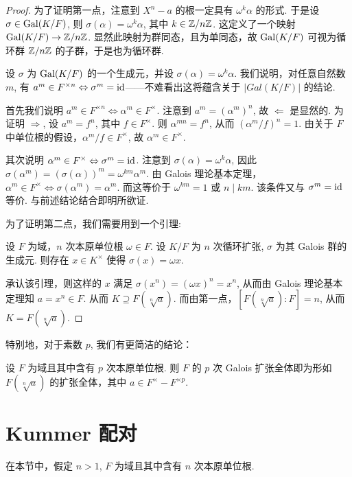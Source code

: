 \begin{proof}
  为了证明第一点，注意到 $X^n - a$ 的根一定具有 $\omega^k \alpha$ 的形式.  于是设 $\sigma \in \operatorname{Gal}(K/F)$, 则 $\sigma(\alpha) = \omega^k \alpha$, 其中 $k \in \mathbb Z/n\mathbb Z$.  这定义了一个映射 $\operatorname{Gal}(K/F) \to \mathbb Z/n\mathbb Z$.  显然此映射为群同态，且为单同态，故 $\operatorname{Gal}(K/F)$ 可视为循环群 $\mathbb Z/n\mathbb Z$ 的子群，于是也为循环群.

  设 $\sigma$ 为 $\operatorname{Gal}(K/F)$ 的一个生成元，并设 $\sigma(\alpha) = \omega^k \alpha$.  我们说明，对任意自然数 $m$, 有 $a^m \in F^{\times n} \Leftrightarrow \sigma^m = \operatorname{id}$——不难看出这将蕴含关于 $|Gal(K/F)|$ 的结论.

  首先我们说明 $a^m \in F^{\times n} \Leftrightarrow \alpha^m \in F^\times$.  注意到 $a^m = (\alpha^m)^n$, 故 $\Leftarrow$ 是显然的.  为证明 $\Rightarrow$, 设 $a^m = f^n$, 其中 $f \in F^\times$.  则 $\alpha^{mn} = f^n$, 从而 $(\alpha^m/f)^n = 1$.  由关于 $F$ 中单位根的假设，$\alpha^m/f \in F^\times$, 故 $\alpha^m \in F^\times$.

  其次说明 $\alpha^m \in F^\times \Leftrightarrow \sigma^m = \operatorname{id}$.  注意到 $\sigma(\alpha) = \omega^k \alpha$, 因此 $\sigma(\alpha^m) = (\sigma(\alpha))^m = \omega^{km} \alpha^m$.  由 Galois 理论基本定理，$\alpha^m \in F^\times \Leftrightarrow \sigma(\alpha^m) = \alpha^m$.  而这等价于 $\omega^{km} = 1$ 或 $n \mid km$.  该条件又与 $\sigma^m = \operatorname{id}$ 等价.  与前述结论结合即明所欲证.

  为了证明第二点，我们需要用到一个引理:
  \begin{lemma}[Hilbert “定理 90”]
    设 $F$ 为域，$n$ 次本原单位根 $\omega \in F$.  设 $K/F$ 为 $n$ 次循环扩张, $\sigma$ 为其 Galois 群的生成元.  则存在 $x \in K^\times$ 使得 $\sigma(x) = \omega x$.
    \label{lem:satz90}
  \end{lemma}

  承认该引理，则这样的 $x$ 满足 $\sigma(x^n) = (\omega x)^n = x^n$, 从而由 Galois 理论基本定理知 $a = x^n \in F$.  从而 $K \supseteq F(\sqrt[n]{a})$.  而由第一点，$[F(\sqrt[n]{a}) : F] = n$, 从而 $K = F(\sqrt[n]{a})$.
\end{proof}

特别地，对于素数 $p$, 我们有更简洁的结论：
\begin{cor}
  设 $F$ 为域且其中含有 $p$ 次本原单位根.  则 $F$ 的 $p$ 次 Galois 扩张全体即为形如 $F(\sqrt[n]{a})$ 的扩张全体，其中 $a \in F^\times - F^{\times p}$.
\end{cor}

\section{Kummer 配对}
在本节中，假定 $n > 1$, $F$ 为域且其中含有 $n$ 次本原单位根.

